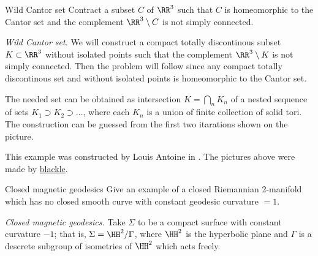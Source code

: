 \begin{pr}{}{Wild Cantor set}\label{Wild Cantor set} 
Contract a subset $C$ of $\RR^3$ 
such that $C$ is homeomorphic to the Cantor set and the complement $\RR^3\setminus C$ is not simply connected.
\end{pr}



\textit{Wild Cantor set.}
We will construct a compact totally discontinous subset $K\subset\RR^3$ without isolated points  
such that the complement $\RR^3\setminus K$ is not simply connected.
Then the problem will follow
since any compact totally discontinous set and without isolated points
is homeomorphic to the Cantor set.

The needed set can be obtained as intersection $K=\bigcap_n K_n$
of a nested sequence 
of sets $K_1\supset K_2\supset\dots$, where each $K_n$ is a union of finite collection of solid tori. 
The construction can be guessed from the first two itarations shown on the picture.

This example was constructed by Louis Antoine in \cite{antoine}.
The pictures above were made by \href{http://en.wikipedia.org/wiki/User:Blacklemon67}{blackle}.


























\begin{pr}{}{Closed magnetic geodesics}\label{twisted-geodesic} %
Give an example of a closed Riemannian 
2-manifold which has no closed smooth curve with constant geodesic curvature $=1$.
\end{pr}

\textit{Closed magnetic geodesics.}
Take $\Sigma$ to be a compact surface with constant curvature $-1$;
that is, 
 $\Sigma=\HH^2/\Gamma$,
where $\HH^2$
is the hyperbolic plane 
and $\Gamma$ is a descrete subgroup of isometries of $\HH^2$ which acts freely.

